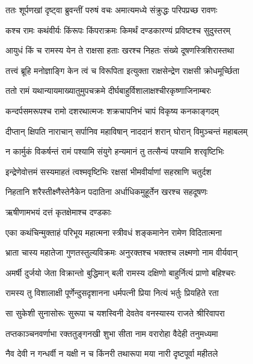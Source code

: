 
\twolineshloka
{ततः शूर्पणखां दृष्ट्वा ब्रुवन्तीं परुषं वचः}
{अमात्यमध्ये संक्रुद्धः परिपप्रच्छ रावणः} %

\twolineshloka
{कश्च रामः कथंवीर्यः किंरूपः किंपराक्रमः}
{किमर्थं दण्डकारण्यं प्रविष्टश्च सुदुस्तरम्} %

\twolineshloka
{आयुधं किं च रामस्य येन ते राक्षसा हताः}
{खरश्च निहतः संख्ये दूषणस्त्रिशिरास्तथा} %

\twolineshloka
{तत्त्वं ब्रूहि मनोज्ञाङ्गि केन त्वं च विरूपिता}
{इत्युक्ता राक्षसेन्द्रेण राक्षसी क्रोधमूर्च्छिता} %

\twolineshloka
{ततो रामं यथान्यायमाख्यातुमुपचक्रमे}
{दीर्घबाहुर्विशालाक्षश्चीरकृष्णाजिनाम्बरः} %

\twolineshloka
{कन्दर्पसमरूपश्च रामो दशरथात्मजः}
{शक्रचापनिभं चापं विकृष्य कनकाङ्गदम्} %

\twolineshloka
{दीप्तान् क्षिपति नाराचान् सर्पानिव महाविषान्}
{नाददानं शरान् घोरान् विमुञ्चन्तं महाबलम्} %

\twolineshloka
{न कार्मुकं विकर्षन्तं रामं पश्यामि संयुगे}
{हन्यमानं तु तत्सैन्यं पश्यामि शरवृष्टिभिः} %

\twolineshloka
{इन्द्रेणेवोत्तमं सस्यमाहतं त्वश्मवृष्टिभिः}
{रक्षसां भीमवीर्याणां सहस्राणि चतुर्दश} %

\twolineshloka
{निहतानि शरैस्तीक्ष्णैस्तेनैकेन पदातिना}
{अर्धाधिकमुहूर्तेन खरश्च सहदूषणः} %

\onelineshloka
{ऋषीणामभयं दत्तं कृतक्षेमाश्च दण्डकाः} %

\twolineshloka
{एका कथंचिन्मुक्ताहं परिभूय महात्मना}
{स्त्रीवधं शङ्कमानेन रामेण विदितात्मना} %

\twolineshloka
{भ्राता चास्य महातेजा गुणतस्तुल्यविक्रमः}
{अनुरक्तश्च भक्तश्च लक्ष्मणो नाम वीर्यवान्} %

\twolineshloka
{अमर्षी दुर्जयो जेता विक्रान्तो बुद्धिमान् बली}
{रामस्य दक्षिणो बाहुर्नित्यं प्राणो बहिश्चरः} %

\twolineshloka
{रामस्य तु विशालाक्षी पूर्णेन्दुसदृशानना}
{धर्मपत्नी प्रिया नित्यं भर्तुः प्रियहिते रता} %

\twolineshloka
{सा सुकेशी सुनासोरूः सुरूपा च यशस्विनी}
{देवतेव वनस्यास्य राजते श्रीरिवापरा} %

\twolineshloka
{तप्तकाञ्चनवर्णाभा रक्ततुङ्गनखी शुभा}
{सीता नाम वरारोहा वैदेही तनुमध्यमा} %

\twolineshloka
{नैव देवी न गन्धर्वी न यक्षी न च किंनरी}
{तथारूपा मया नारी दृष्टपूर्वा महीतले} %

